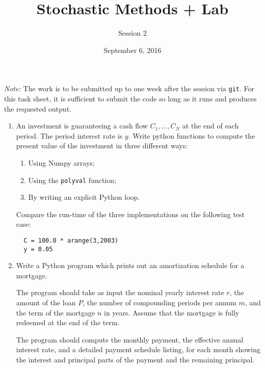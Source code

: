 \documentclass[12pt]{article}
\begin{document}
\title{Stochastic Methods + Lab}
\author{Session 2}
\date{September 6, 2016}
\maketitle

\noindent\emph{Note:} The work is to be submitted up to one week after
the session via \texttt{git}.  For this task sheet, it is sufficient
to submit the code so long as it runs and produces the
requested output.

\begin{enumerate}

\item An investment is guaranteeing a cash flow $C_1, \dots, C_N$ at
the end of each period.  The period interest rate is $y$.  Write
python functions to compute the present value of the investment in
three different ways:
\begin{enumerate}
\item Using Numpy arrays;
\item Using the \texttt{polyval} function;
\item By writing an explicit Python loop.
\end{enumerate}
Compare the run-time of the three implementations on the following
test case:
\begin{verbatim}
  C = 100.0 * arange(3,2003)
  y = 0.05
\end{verbatim}


\item Write a Python program which prints out an amortization schedule
for a mortgage. 

The program should take as input the nominal yearly interest
rate $r$, the amount of the loan $P$, the number of compounding
periods per annum $m$, and the term of the mortgage $n$ in years.
Assume that the mortgage is fully redeemed at the end of the term.

The program should compute the monthly payment, the effective annual
interest rate, and a detailed payment schedule listing, for each
month showing the interest and principal parts of the payment and the
remaining principal.


\end{enumerate}
\end{document}
